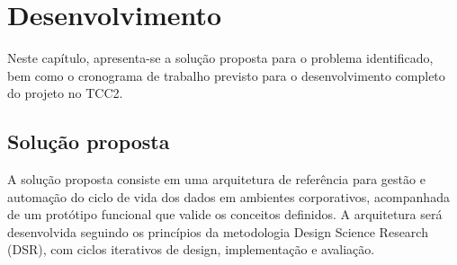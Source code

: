 \documentclass[
    12pt,                %
    openright,           %
    oneside,             %
    a4paper,             %
    english,             %
    brazil               %
]{abntex2}
\begin{document}
\chapter{Desenvolvimento}
\label{cap:desenvolvimento}

Neste capítulo, apresenta-se a solução proposta para o problema identificado, bem como o cronograma de trabalho previsto para o desenvolvimento completo do projeto no TCC2.

\section{Solução proposta}
\label{sec:solucao}

A solução proposta consiste em uma arquitetura de referência para gestão e automação do ciclo de vida dos dados em ambientes corporativos, acompanhada de um protótipo funcional que valide os conceitos definidos. A arquitetura será desenvolvida seguindo os princípios da metodologia Design Science Research (DSR), com ciclos iterativos de design, implementação e avaliação.
\end{document}
